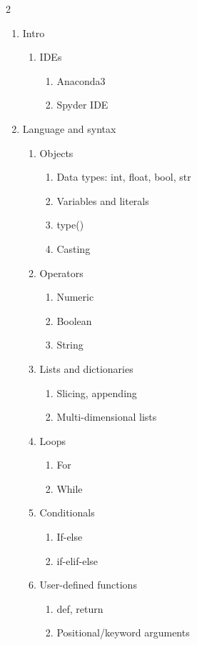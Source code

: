 \documentclass{article}
\begin{document}
\begin{multicols}{2}
\begin{enumerate}
	\item Intro
	\begin{enumerate}
		\item IDEs
		\begin{enumerate}
			\item Anaconda3
			\item Spyder IDE
		\end{enumerate}
	\end{enumerate}
	\item Language and syntax
	\begin{enumerate}
		\item Objects
		\begin{enumerate}
			\item Data types: int, float, bool, str
			\item Variables and literals
			\item type()
			\item Casting
			\end{enumerate}
		\item Operators
		\begin{enumerate}
			\item Numeric
			\item Boolean
			\item String
		\end{enumerate}
		\item Lists and dictionaries
		\begin{enumerate}
			\item Slicing, appending
			\item Multi-dimensional lists
		\end{enumerate}
		\item Loops
		\begin{enumerate}
			\item For
			\item While
		\end{enumerate}
		\item Conditionals
		\begin{enumerate}
			\item If-else
			\item if-elif-else
		\end{enumerate}
		\item User-defined functions
		\begin{enumerate}
			\item def, return
			\item Positional/keyword arguments

\end{enumerate}
\end{enumerate}
\end{enumerate}
\end{multicols}
\end{document}
